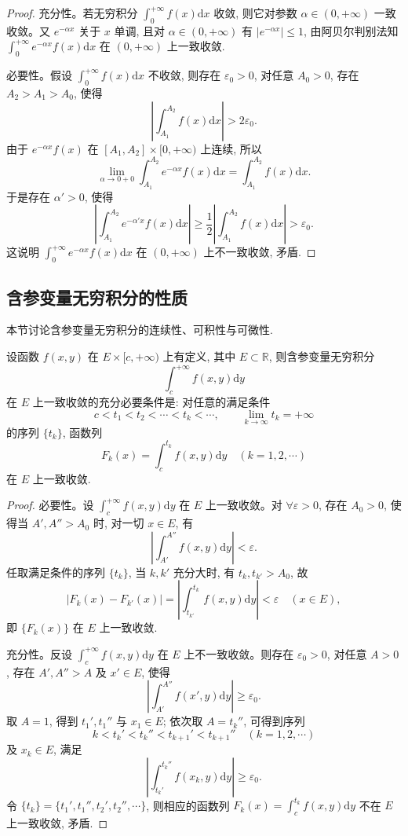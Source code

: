 \begin{proof}
充分性。若无穷积分 $\int_0^{+\infty}f(x)\mathrm dx$ 收敛, 则它对参数 $\alpha\in(0,+\infty)$ 一致收敛。又 $e^{-\alpha x}$ 关于 $x$ 单调, 且对 $\alpha\in(0,+\infty)$ 有 $|e^{-\alpha x}|\leqslant1$, 由阿贝尔判别法知 $\int_0^{+\infty}e^{-\alpha x}f(x)\mathrm dx$ 在 $(0,+\infty)$ 上一致收敛.

必要性。假设 $\int_0^{+\infty}f(x)\mathrm dx$ 不收敛, 则存在 $\varepsilon_0>0$, 对任意 $A_0>0$, 存在 $A_2>A_1>A_0$, 使得
\[
  \left|\int_{A_1}^{A_2}f(x)\mathrm dx\right|>2\varepsilon_0.
\]
由于 $e^{-\alpha x}f(x)$ 在 $[A_1,A_2]\times[0,+\infty)$ 上连续, 所以
\[
  \lim_{\alpha\to0+0}\int_{A_1}^{A_2}e^{-\alpha x}f(x)\mathrm dx
  =\int_{A_1}^{A_2}f(x)\mathrm dx.
\]
于是存在 $\alpha'>0$, 使得
\[
  \left|\int_{A_1}^{A_2}e^{-\alpha'x}f(x)\mathrm dx\right|
  \geqslant \frac12\left|\int_{A_1}^{A_2}f(x)\mathrm dx\right|
  >\varepsilon_0.
\]
这说明 $\int_0^{+\infty}e^{-\alpha x}f(x)\mathrm dx$ 在 $(0,+\infty)$ 上不一致收敛, 矛盾.
\end{proof}


\subsection{含参变量无穷积分的性质}
\label{subsec:ma-17-2-2}

本节讨论含参变量无穷积分的连续性、可积性与可微性.

\begin{theorem}\label{theorem:ma-17-2-5}
设函数 $f(x,y)$ 在 $E\times[c,+\infty)$ 上有定义, 其中 $E\subset\mathbb R$, 则含参变量无穷积分
\[
  \int_c^{+\infty}f(x,y)\mathrm dy
\]
在 $E$ 上一致收敛的充分必要条件是: 对任意的满足条件
\[
  c<t_1<t_2<\cdots<t_k<\cdots,\qquad \lim_{k\to\infty}t_k=+\infty
\]
的序列 $\{t_k\}$, 函数列
\[
  F_k(x)=\int_c^{t_k}f(x,y)\mathrm dy\quad(k=1,2,\cdots)
\]
在 $E$ 上一致收敛.
\end{theorem}


\begin{proof}
必要性。设 $\int_c^{+\infty}f(x,y)\mathrm dy$ 在 $E$ 上一致收敛。对 $\forall\varepsilon>0$, 存在 $A_0>0$, 使得当 $A',A''>A_0$ 时, 对一切 $x\in E$, 有
\[
  \left|\int_{A'}^{A''}f(x,y)\mathrm dy\right|<\varepsilon.
\]
任取满足条件的序列 $\{t_k\}$, 当 $k,k'$ 充分大时, 有 $t_k,t_{k'}>A_0$, 故
\[
  |F_k(x)-F_{k'}(x)|
  =\left|\int_{t_{k'}}^{t_k}f(x,y)\mathrm dy\right|<\varepsilon
  \quad(x\in E),
\]
即 $\{F_k(x)\}$ 在 $E$ 上一致收敛.

充分性。反设 $\int_c^{+\infty}f(x,y)\mathrm dy$ 在 $E$ 上不一致收敛。则存在 $\varepsilon_0>0$, 对任意 $A>0$, 存在 $A',A''>A$ 及 $x'\in E$, 使得
\[
  \left|\int_{A'}^{A''}f(x',y)\mathrm dy\right|\geqslant\varepsilon_0.
\]
取 $A=1$, 得到 $t_1',t_1''$ 与 $x_1\in E$; 依次取 $A=t_k''$, 可得到序列
\[
  k<t_k'<t_k''<t_{k+1}'<t_{k+1}''\quad(k=1,2,\cdots)
\]
及 $x_k\in E$, 满足
\[
  \left|\int_{t_k'}^{t_k''}f(x_k,y)\mathrm dy\right|\geqslant\varepsilon_0.
\]
令 $\{t_k\}=\{t_1',t_1'',t_2',t_2'',\cdots\}$, 则相应的函数列 $F_k(x)=\int_c^{t_k}f(x,y)\mathrm dy$ 不在 $E$ 上一致收敛, 矛盾.
\end{proof}


